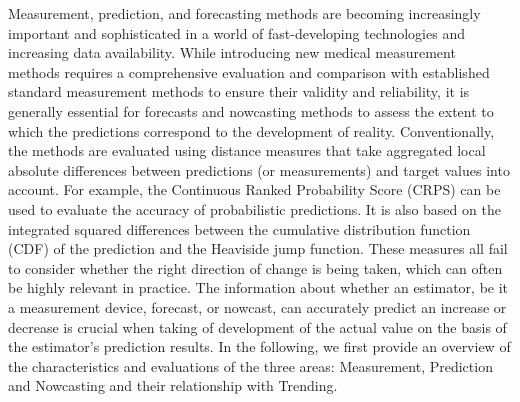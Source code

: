 
Measurement, prediction, and forecasting methods are becoming increasingly important and sophisticated in a world of fast-developing technologies and increasing data availability. While introducing new medical measurement methods requires a comprehensive evaluation and comparison with established standard measurement methods to ensure their validity and reliability, it is generally essential for forecasts and nowcasting methods to assess the extent to which the predictions correspond to the development of reality. Conventionally, the methods are evaluated using distance measures that take aggregated local absolute differences between predictions (or measurements) and target values into account. For example, the Continuous Ranked Probability Score (CRPS) can be used to evaluate the accuracy of probabilistic predictions. It is also based on the integrated squared differences between the cumulative distribution function (CDF) of the prediction and the Heaviside jump function. These measures all fail to consider whether the right direction of change is being taken, which can often be highly relevant in practice. The information about whether an estimator, be it a measurement device, forecast, or nowcast, can accurately predict an increase or decrease is crucial when taking  of development of the actual value on the basis of the estimator's prediction results. In the following, we first provide an overview of the characteristics and evaluations of the three areas: Measurement, Prediction and Nowcasting and their relationship with Trending.
 
